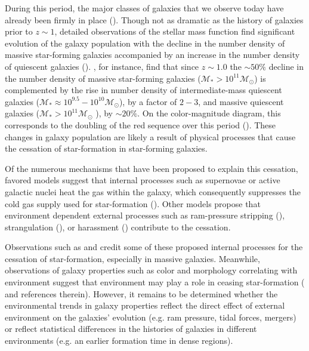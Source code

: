 During this period, the major classes of galaxies that we observe today have already been firmly in place (\citealt{bundy06a, borch06a, taylor09a, Moustakas:2013aa}). Though not as dramatic as the history of galaxies prior to $z \sim 1$, detailed observations of the stellar mass function find significant evolution of the galaxy population with the decline in the number density of massive star-forming galaxies accompanied by an increase in the number density of quiescent galaxies (\citealt{Blanton:2006ab, bundy06a,  borch06a, Moustakas:2013aa}). \cite{Moustakas:2013aa}, for instance, find that since $z \sim 1.0$ the $\sim 50\%$ decline in the number density of massive star-forming galaxies ($\mathcal{M}_{*} > 10^{11} \mathcal{M}_{\odot}$) is complemented by the rise in number density of intermediate-mass quiescent galaxies ($\mathcal{M}_{*} \approx 10^{9.5} - 10^{10}\mathcal{M}_{\odot}$), by a factor of $ 2-3$, and massive quiescent galaxies ($\mathcal{M}_{*} > 10^{11} \mathcal{M}_{\odot}$ ), by $\sim 20\%$. On the color-magnitude diagram, this corresponds to the doubling of the red sequence over this period (\citealt{Bell:2004aa, borch06a, Faber:2007aa}). These changes in galaxy population are likely a result of physical processes that cause the cessation of star-formation in star-forming galaxies. 

Of the numerous mechanisms that have been proposed to explain this cessation, favored models suggest that internal processes such as supernovae or active galactic nuclei heat the gas within the galaxy, which consequently suppresses the cold gas supply used for star-formation (\citealt{Keres:2005aa, Croton:2006aa, Dekel:2008aa}). Other models propose that environment dependent external processes such as ram-pressure stripping (\citealt{Gunn:1972aa, Bekki:2009aa}), strangulation (\citealt{Larson:1980aa, Balogh:2000aa}), or harassment (\citealt{Moore:1998aa}) contribute to the cessation. 

Observations such as \cite{Weinmann:2006aa} and \cite{Peng:2010aa} credit some of these proposed internal processes for the cessation of star-formation, especially in massive galaxies. Meanwhile, observations of galaxy properties such as color and morphology correlating with environment suggest that environment may play a role in ceasing star-formation (\citealt{blanton09a} and references therein). However, it remains to be determined whether the environmental trends in galaxy properties reflect the direct effect of external environment on the galaxies' evolution (e.g. ram pressure, tidal forces, mergers) or reflect statistical differences in the histories of galaxies in different environments (e.g. an earlier formation time in dense regions).


